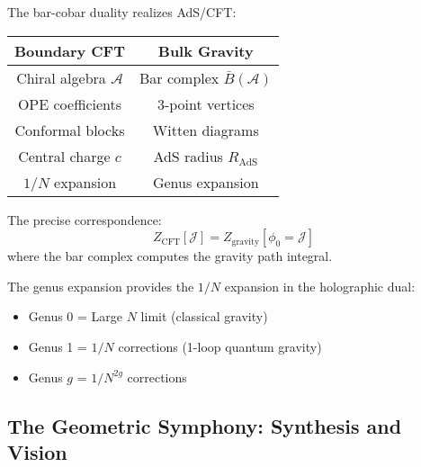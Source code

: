 \begin{corollary}
The bar-cobar duality realizes AdS/CFT:
\begin{center}
\begin{tabular}{|c|c|}
\hline
\textbf{Boundary CFT} & \textbf{Bulk Gravity} \\
\hline
Chiral algebra $\mathcal{A}$ & Bar complex $\bar{B}(\mathcal{A})$ \\
OPE coefficients & 3-point vertices \\
Conformal blocks & Witten diagrams \\
Central charge $c$ & AdS radius $R_{\text{AdS}}$ \\
$1/N$ expansion & Genus expansion \\
\hline
\end{tabular}
\end{center}

The precise correspondence:
$$Z_{\text{CFT}}[\mathcal{J}] = Z_{\text{gravity}}[\phi_0 = \mathcal{J}]$$
where the bar complex computes the gravity path integral.

The genus expansion provides the $1/N$ expansion in the holographic dual:
\begin{itemize}
\item Genus 0 = Large $N$ limit (classical gravity)
\item Genus 1 = $1/N$ corrections (1-loop quantum gravity)
\item Genus $g$ = $1/N^{2g}$ corrections
\end{itemize}
\end{corollary}


\subsection{The Geometric Symphony: Synthesis and Vision}\label{subsec:synthesis}

